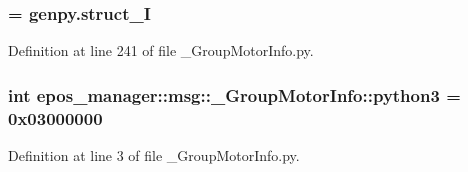 \subsubsection[{\-\_\-struct\-\_\-\-I}]{ = genpy.\-struct\-\_\-\-I}\label{namespaceepos__manager_1_1msg_1_1__GroupMotorInfo_a52369c5d276ff241a11d6b09eb710412}


\-Definition at line 241 of file \-\_\-\-Group\-Motor\-Info.\-py.

\subsubsection[{python3}]{\setlength{\rightskip}{0pt plus 5cm}int {\bf epos\-\_\-manager\-::msg\-::\-\_\-\-Group\-Motor\-Info\-::python3} = 0x03000000}\label{namespaceepos__manager_1_1msg_1_1__GroupMotorInfo_a55b384af0560cdc1ddf0c4d476546520}


\-Definition at line 3 of file \-\_\-\-Group\-Motor\-Info.\-py.

